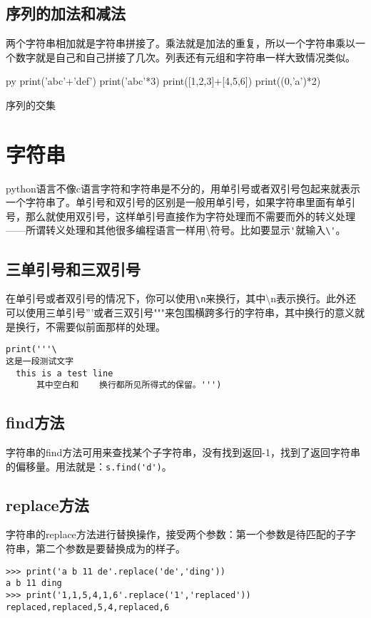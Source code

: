 \documentclass[12pt,oneside]{book}
\begin{document}
\begin{common-format}
\subsection{序列的加法和减法}
两个字符串相加就是字符串拼接了。乘法就是加法的重复，所以一个字符串乘以一个数字就是自己和自己拼接了几次。列表还有元组和字符串一样大致情况类似。

\begin{xverbatim}[129]{py}
print('abc'+'def')
print('abc'*3)
print([1,2,3]+[4,5,6])
print((0,'a')*2)
\end{xverbatim}

序列的交集



\section{字符串}
python语言不像c语言字符和字符串是不分的，用单引号或者双引号包起来就表示一个字符串了。单引号和双引号的区别是一般用单引号，如果字符串里面有单引号，那么就使用双引号，这样单引号直接作为字符处理而不需要而外的转义处理——所谓转义处理和其他很多编程语言一样用\textbackslash 符号。比如要显示\verb+'+就输入\verb+\'+。

\subsection{三单引号和三双引号}
在单引号或者双引号的情况下，你可以使用\verb+\n+来换行，其中\textbackslash n表示换行。此外还可以使用三单引号'''或者三双引号"""来包围横跨多行的字符串，其中换行的意义就是换行，不需要似前面那样的处理。

\begin{Verbatim}
print('''\
这是一段测试文字
  this is a test line
      其中空白和    换行都所见所得式的保留。''')
\end{Verbatim}


\subsection{find方法}
字符串的find方法可用来查找某个子字符串，没有找到返回-1，找到了返回字符串的偏移量。用法就是：\verb+s.find('d')+。


\subsection{replace方法}
字符串的replace方法进行替换操作，接受两个参数：第一个参数是待匹配的子字符串，第二个参数是要替换成为的样子。
\begin{Verbatim}
>>> print('a b 11 de'.replace('de','ding'))
a b 11 ding
>>> print('1,1,5,4,1,6'.replace('1','replaced'))
replaced,replaced,5,4,replaced,6
\end{Verbatim}





\end{common-format}
\end{document}
